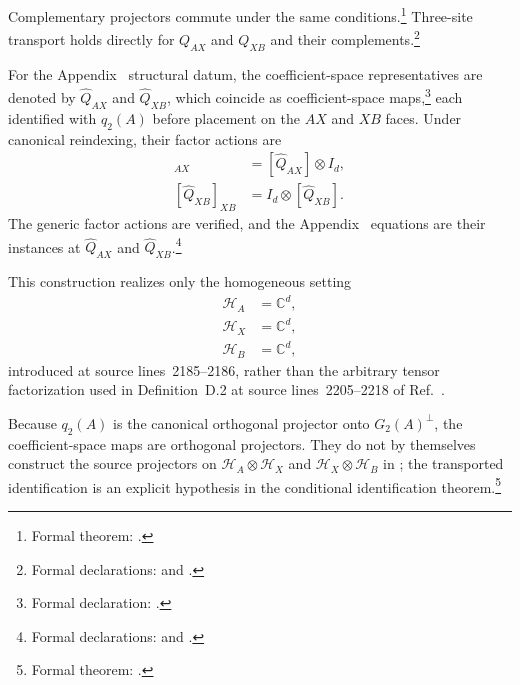 \documentclass{article}
\begin{document}
Complementary projectors commute under the same conditions.\footnote{Formal
theorem: .}
Three-site transport holds directly for $Q_{AX}$ and $Q_{XB}$ and their
complements.\footnote{Formal declarations:
 and
.}

For the Appendix~ structural datum, the coefficient-space
representatives are denoted by $\widehat Q_{AX}$ and $\widehat
Q_{XB}$, which coincide as coefficient-space maps,\footnote{Formal declaration:
.} each
identified with $q_2(A)$ before placement on the $AX$ and $XB$ faces. Under
canonical reindexing, their factor actions are
\begin{align}
    [\widehat Q_{AX}]_{AX}
        &=[\widehat Q_{AX}]\otimes I_d,
    \label{eq:cpsv16_parent_commuting_hamiltonian_scope_qax_factor_action}\\
    [\widehat Q_{XB}]_{XB}
        &=I_d\otimes[\widehat Q_{XB}].
    \label{eq:cpsv16_parent_commuting_hamiltonian_scope_qxb_factor_action}
\end{align}
The generic factor actions are verified, and the Appendix~
equations are their instances at $\widehat Q_{AX}$ and
$\widehat Q_{XB}$.\footnote{Formal declarations:
 and
.}

This construction realizes only the homogeneous setting
\begin{align}
    \mathcal H_A
        &=\mathbb C^d,
    \label{eq:cpsv16_parent_commuting_hamiltonian_scope_homogeneous_a}\\
    \mathcal H_X
        &=\mathbb C^d,
    \label{eq:cpsv16_parent_commuting_hamiltonian_scope_homogeneous_x}\\
    \mathcal H_B
        &=\mathbb C^d,
    \label{eq:cpsv16_parent_commuting_hamiltonian_scope_homogeneous_b}
\end{align}
introduced at source lines~2185--2186, rather than the arbitrary tensor
factorization used in Definition~D.2 at source lines~2205--2218 of
Ref.~\cite{Cirac2016MPDO_arXiv}.

Because $q_2(A)$ is the canonical orthogonal projector onto $G_2(A)^\perp$,
the coefficient-space maps are orthogonal projectors. They do not by themselves
construct the source projectors on $\mathcal H_A\otimes\mathcal H_X$ and
$\mathcal H_X\otimes\mathcal H_B$ in
; the transported
identification is an explicit hypothesis in the conditional identification
theorem.\footnote{Formal theorem:
.}
\end{document}
